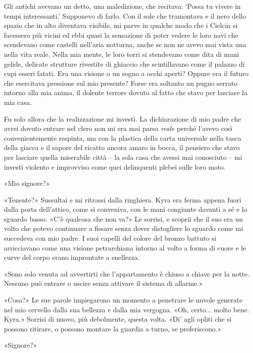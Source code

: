 Gli antichi avevano un detto, una maledizione, che recitava: `Possa tu
vivere in tempi interessanti.' Supponevo di farlo. Con il sole che
tramontava e il nero dello spazio che in alto diventava visibile, mi
parve in qualche modo che i Cielcin si facessero più vicini ed ebbi
quasi la sensazione di poter vedere le loro navi che scendevano come
castelli nell'aria notturna, anche se non ne avevo mai vista una nella
vita reale. Nella mia mente, le loro torri si stendevano come dita di
mani gelide, delicate strutture rivestite di ghiaccio che scintillavano
come il palazzo di cupi esseri fatati. Era una visione o un sogno a
occhi aperti? Oppure era il futuro che esercitava pressione sul mio
presente? Forse era soltanto un pugno serrato intorno alla mia anima, il
dolente terrore dovuto al fatto che stavo per lasciare la mia casa.

Fu solo allora che la realizzazione mi investì. La dichiarazione di mio
padre che avrei dovuto entrare nel clero non mi era mai parsa
\emph{reale} perché l'avevo così convenientemente respinta, ma con la
plastica della carta universale nella tasca della giacca e il sapore del
ricatto ancora amaro in bocca, il pensiero che stavo per lasciare quella
miserabile città -- la sola casa che avessi mai conosciuto -- mi investì
violento e improvviso come quei delinquenti plebei sulle loro moto.

«Mio signore?»

«Tenente?» Sussultai e mi ritrassi dalla ringhiera. Kyra era ferma
appena fuori dalla porta dell'attico, come si conveniva, con le mani
congiunte davanti a sé e lo sguardo basso. «C'è qualcosa che non va?» Le
sorrisi, e scoprii che il suo era un volto che potevo continuare a
fissare senza dover distogliere lo sguardo come mi succedeva con mio
padre. I suoi capelli del colore del bronzo battuto si arricciavano come
una visione petrarchiana intorno al volto a forma di cuore e le curve
del corpo erano improntate a snellezza.

«Sono solo venuta ad avvertirti che l'appartamento è chiuso a chiave per
la notte. Nessuno può entrare o uscire senza attivare il sistema di
allarme.»

«Cosa?» Le sue parole impiegarono un momento a penetrare le nuvole
generate nel mio cervello dalla sua bellezza e dalla mia vergogna. «Oh,
certo... molto bene. Kyra.» Sorrisi di nuovo, più debolmente, questa
volta. «Di' agli opliti che si possono ritirare, o possono montare la
guardia a turno, se preferiscono.»

«Signore?»


